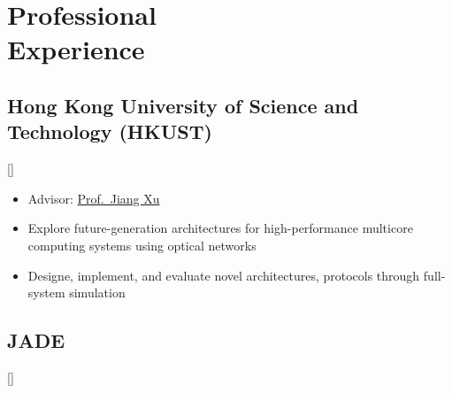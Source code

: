 \documentclass{mycv}
\begin{document}
\maketitle%

%
%

\section{Professional \\ Experience}

\subsection{Hong Kong University of Science and Technology (HKUST)}[]
\begin{positions}
\end{positions}

\begin{itemize}
  \item Advisor: \href{https://eexu.home.ece.ust.hk/}{Prof.~Jiang Xu}
  \item Explore future-generation architectures for high-performance multicore computing systems using optical networks 
  \item Designe, implement, and evaluate novel architectures, protocols through full-system simulation
\end{itemize}

\subsection{JADE}[]
\begin{positions}
\end{positions}
\end{document}
